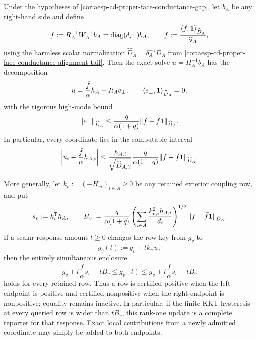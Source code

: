 \begin{corollary}
\label{cor:aesp-cd-proper-face-rank-one-inverse}
Under the hypotheses of
\cref{cor:aesp-cd-proper-face-conductance-gap}, let \(b_A\) be any right-hand
side and define
\begin{equation*}
 f:=R_A^{-1}W_A^{-1}b_A=\operatorname{diag}(d_i^{-1})b_A,
 \qquad
 \bar f:=\frac{\langle f,\mathbf{1}\rangle_{\widehat D_A}}
                  {\widehat{\mathsf v}_A},
\end{equation*}
using the harmless scalar normalization
\(\widehat D_A=\delta_A^{-1}\bar D_A\) from
\cref{cor:aesp-cd-proper-face-conductance-alignment-tail}.  Then the exact
solve \(u=H_A^{-1}b_A\) has the decomposition
\begin{equation}
 u=\frac{\bar f}{\alpha}h_A+R_Ae_\perp,
 \qquad
 \langle e_\perp,\mathbf{1}\rangle_{\widehat D_A}=0,
 \label{eq:aesp-cd-proper-face-rank-one-inverse}
\end{equation}
with the rigorous high-mode bound
\begin{equation}
 \lVert e_\perp\rVert_{\widehat D_A}
 \leq\frac{q}{\alpha(1+q)}
       \lVert f-\bar f\mathbf{1}\rVert_{\widehat D_A}.
 \label{eq:aesp-cd-proper-face-rank-one-error}
\end{equation}
In particular, every coordinate lies in the computable interval
\begin{equation}
 \left|u_i-\frac{\bar f}{\alpha}h_{A,i}\right|
 \leq
 \frac{h_{A,i}}{\sqrt{\widehat D_{A,ii}}}
 \frac{q}{\alpha(1+q)}
 \lVert f-\bar f\mathbf{1}\rVert_{\widehat D_A}.
 \label{eq:aesp-cd-proper-face-rank-one-coordinate}
\end{equation}

More generally, let \(k_v:=(-H_{vi})_{i\in A}\geq0\) be any retained
exterior coupling row, and put
\begin{equation*}
 s_v:=k_v^{\mathsf T}h_A,
 \qquad
 B_v:=
 \frac{q}{\alpha(1+q)}
 \left(\sum_{i\in A}\frac{k_{v,i}^2h_{A,i}}{d_i}\right)^{1/2}
 \lVert f-\bar f\mathbf{1}\rVert_{\bar D_A}.
\end{equation*}
If a scalar response amount \(t\geq0\) changes the row key from \(g_v\) to
\begin{equation*}
 g_v(t):=g_v+t k_v^{\mathsf T}u,
\end{equation*}
then the entirely simultaneous enclosure
\begin{equation}
 g_v+t\frac{\bar f}{\alpha}s_v-tB_v
 \leq g_v(t)\leq
 g_v+t\frac{\bar f}{\alpha}s_v+tB_v
 \label{eq:aesp-cd-proper-face-rank-one-row-band}
\end{equation}
holds for every retained row.  Thus a row is certified positive when the
left endpoint is positive and certified nonpositive when the right endpoint
is nonpositive; equality remains inactive.  In particular, if the finite KKT
hysteresis at every queried row is wider than \(tB_v\), this rank-one update
is a complete reporter for that response.  Exact local contributions from a
newly admitted coordinate may simply be added to both endpoints.


\end{corollary}
